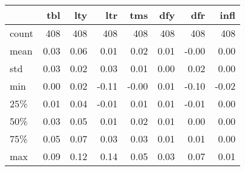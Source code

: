 \begin{tabular}{lrrrrrrr}
  \toprule
  {} &   tbl &   lty &   ltr &   tms &   dfy &   dfr &  infl \\
  \midrule
  count &  408 &  408 &  408 &  408 &  408 &  408 &  408 \\
  mean  &    0.03 &    0.06 &    0.01 &    0.02 &    0.01 &   -0.00 &    0.00 \\
  std   &    0.03 &    0.02 &    0.03 &    0.01 &    0.00 &    0.02 &    0.00 \\
  min   &    0.00 &    0.02 &   -0.11 &   -0.00 &    0.01 &   -0.10 &   -0.02 \\
  25\%   &    0.01 &    0.04 &   -0.01 &    0.01 &    0.01 &   -0.01 &    0.00 \\
  50\%   &    0.03 &    0.05 &    0.01 &    0.02 &    0.01 &    0.00 &    0.00 \\
  75\%   &    0.05 &    0.07 &    0.03 &    0.03 &    0.01 &    0.01 &    0.00 \\
  max   &    0.09 &    0.12 &    0.14 &    0.05 &    0.03 &    0.07 &    0.01 \\
  \bottomrule
  \end{tabular}